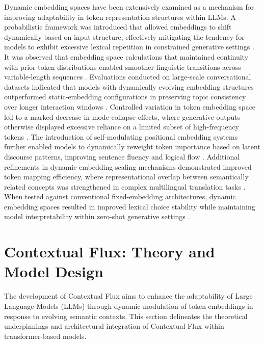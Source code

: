 \documentclass{article}
\begin{document}
Dynamic embedding spaces have been extensively examined as a mechanism for improving adaptability in token representation structures within LLMs. A probabilistic framework was introduced that allowed embeddings to shift dynamically based on input structure, effectively mitigating the tendency for models to exhibit excessive lexical repetition in constrained generative settings \cite{baronova2024dynamic}. It was observed that embedding space calculations that maintained continuity with prior token distributions enabled smoother linguistic transitions across variable-length sequences \cite{sawhai2024token}. Evaluations conducted on large-scale conversational datasets indicated that models with dynamically evolving embedding structures outperformed static-embedding configurations in preserving topic consistency over longer interaction windows \cite{ tokar2024contextual}. Controlled variation in token embedding space led to a marked decrease in mode collapse effects, where generative outputs otherwise displayed excessive reliance on a limited subset of high-frequency tokens \cite{chen2024dynamic}. The introduction of self-modulating positional embedding systems further enabled models to dynamically reweight token importance based on latent discourse patterns, improving sentence fluency and logical flow \cite{sasaki2024enhancing}. Additional refinements in dynamic embedding scaling mechanisms demonstrated improved token mapping efficiency, where representational overlap between semantically related concepts was strengthened in complex multilingual translation tasks \cite{tu2024reinforcement}. When tested against conventional fixed-embedding architectures, dynamic embedding spaces resulted in improved lexical choice stability while maintaining model interpretability within zero-shot generative settings \cite{wong2024efficiency}. 



\section{Contextual Flux: Theory and Model Design}

The development of Contextual Flux aims to enhance the adaptability of Large Language Models (LLMs) through dynamic modulation of token embeddings in response to evolving semantic contexts. This section delineates the theoretical underpinnings and architectural integration of Contextual Flux within transformer-based models.
\end{document}
